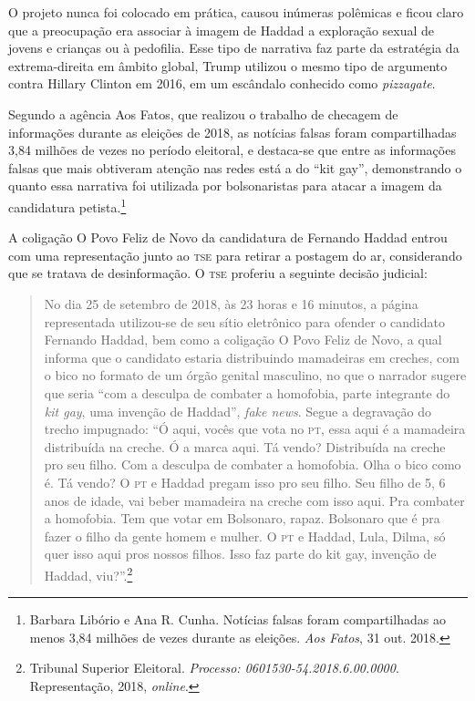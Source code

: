 O projeto nunca foi colocado em prática, causou inúmeras polêmicas e
ficou claro que a preocupação era associar à imagem de Haddad a
exploração sexual de jovens e crianças ou à pedofilia. Esse tipo de
narrativa faz parte da estratégia da extrema-direita em âmbito global,
Trump utilizou o mesmo tipo de argumento contra Hillary Clinton em 2016,
em um escândalo conhecido como \textit{pizzagate}.

Segundo a agência Aos Fatos, que realizou o trabalho de checagem de
informações durante as eleições de 2018, as notícias falsas foram
compartilhadas 3,84 milhões de vezes no período eleitoral, e destaca-se
que entre as informações falsas que mais obtiveram atenção nas redes
está a do ``kit gay'', demonstrando o quanto essa narrativa foi
utilizada por bolsonaristas para atacar a imagem da candidatura petista.\footnote{Barbara Libório e Ana R. Cunha. Notícias falsas foram
compartilhadas ao menos 3,84 milhões de vezes durante as eleições. \textit{Aos
Fatos}, 31 out. 2018.}

A coligação O Povo Feliz de Novo da candidatura de Fernando Haddad
entrou com uma representação junto ao \textsc{tse}
para retirar a postagem do ar, considerando que se tratava de
desinformação. O \textsc{tse} proferiu a seguinte decisão judicial:

\begin{quote}
No dia 25 de setembro de 2018, às 23 horas e 16 minutos, a página representada
utilizou-se de seu sítio eletrônico para ofender o candidato Fernando
Haddad, bem como a coligação O Povo Feliz de Novo, a qual informa que o
candidato estaria distribuindo mamadeiras em creches, com o bico no
formato de um órgão genital masculino, no que o narrador sugere que
seria ``com a desculpa de combater a homofobia, parte integrante do \textit{kit
gay}, uma invenção de Haddad'', \textit{fake news}. Segue a degravação do trecho
impugnado: ``Ó aqui, vocês que vota no \textsc{pt}, essa aqui é a mamadeira
distribuída na creche. Ó a marca aqui. Tá vendo? Distribuída na creche
pro seu filho. Com a desculpa de combater a homofobia. Olha o bico como
é. Tá vendo? O \textsc{pt} e Haddad pregam isso pro seu filho. Seu filho de 5, 6
anos de idade, vai beber mamadeira na creche com isso aqui. Pra combater
a homofobia. Tem que votar em Bolsonaro, rapaz. Bolsonaro que é pra
fazer o filho da gente homem e mulher. O \textsc{pt} e Haddad, Lula, Dilma, só
quer isso aqui pros nossos filhos. Isso faz parte do kit gay, invenção
de Haddad, viu?''.\footnote{Tribunal Superior Eleitoral. \textit{Processo: 0601530-54.2018.6.00.0000}. Representação, 2018, \textit{online}.}
\end{quote}

